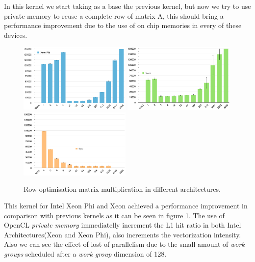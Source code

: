 \par{In this kernel we start taking as a base the previous kernel, but now we try to use private memory to reuse a complete row of
    matrix A, this should bring a performance improvement due to the use of on chip memories in every of these devices.}



\begin{figure}[!h]
    \centering
    \includegraphics[width=0.49\textwidth]{figures/opt2_phi.png}
    \includegraphics[width=0.49\textwidth]{figures/opt2_cpu.png}
    \includegraphics[width=0.49\textwidth]{figures/opt2_gpu.png}
    \caption{Row optimisation matrix multiplication in different architectures.}
    \label{Rows}
\end{figure}

\par{This kernel for Intel Xeon Phi and Xeon achieved a performance improvement in comparison with previous kernels as it can 
    be seen in figure \ref{Rows}. The use of OpenCL \emph{private memory} immediatelly increment the L1 hit ratio in both Intel
    Architectures(Xeon and Xeon Phi), also increments the vectorization intensity. Also we can see the effect of lost of parallelism
    due to the small amount of \emph{work groups} scheduled after a \emph{work group} dimension of 128.}

